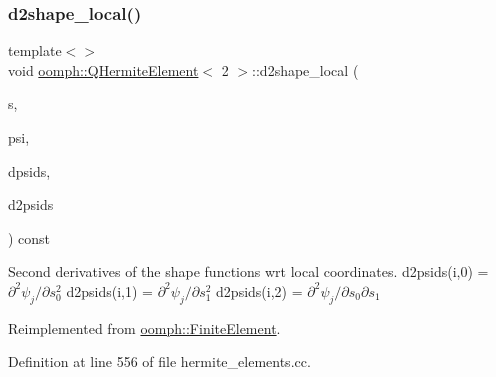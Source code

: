 \mbox{\label{classoomph_1_1QHermiteElement_afc15c72626666d41a190ab183573354d}} 
\subsubsection{\texorpdfstring{d2shape\+\_\+local()}{d2shape\_local()}\hspace{0.1cm}{\footnotesize\ttfamily [3/3]}}
{\footnotesize\ttfamily template$<$$>$ \\
void \hyperlink{classoomph_1_1QHermiteElement}{oomph\+::\+Q\+Hermite\+Element}$<$ 2 $>$\+::d2shape\+\_\+local (\begin{DoxyParamCaption}\item[{const \hyperlink{classoomph_1_1Vector}{Vector}$<$ double $>$ \&}]{s,  }\item[{\hyperlink{classoomph_1_1Shape}{Shape} \&}]{psi,  }\item[{\hyperlink{classoomph_1_1DShape}{D\+Shape} \&}]{dpsids,  }\item[{\hyperlink{classoomph_1_1DShape}{D\+Shape} \&}]{d2psids }\end{DoxyParamCaption}) const\hspace{0.3cm}{\ttfamily [virtual]}}

Second derivatives of the shape functions wrt local coordinates. d2psids(i,0) = $ \partial^2 \psi_j / \partial s_0^2 $ d2psids(i,1) = $ \partial^2 \psi_j / \partial s_1^2 $ d2psids(i,2) = $ \partial^2 \psi_j / \partial s_0 \partial s_1 $ 

Reimplemented from \hyperlink{classoomph_1_1FiniteElement_a53e5051582d9da07b9d35da9debd0cd7}{oomph\+::\+Finite\+Element}.



Definition at line 556 of file hermite\+\_\+elements.\+cc.

\mbox{\label{classoomph_1_1QHermiteElement_a4b734edf4d55bc795fca98845609fa55}} 
